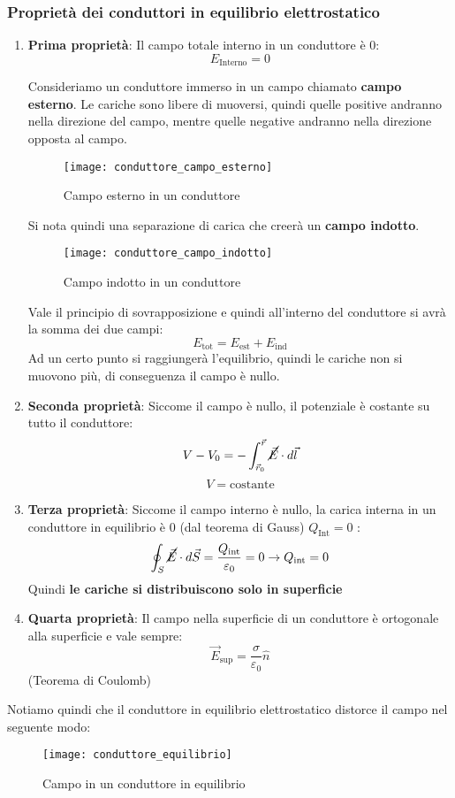 \documentclass[a4paper]{article}
\begin{document}
\subsubsection{Proprietà dei conduttori in equilibrio elettrostatico}
\begin{enumerate}
  \item \textbf{Prima proprietà}: Il campo totale interno in un conduttore è 0:
    \[
      E_{\text{Interno}} = 0
    \] 

    \vspace{1em}
    \noindent
    Consideriamo un conduttore immerso in un campo chiamato \textbf{campo esterno}.
    Le cariche sono libere di muoversi, quindi quelle positive andranno nella direzione
    del campo, mentre quelle negative andranno nella direzione opposta al campo.
    \begin{figure}[H]
      \centering
      \texttt{[image: conduttore\_campo\_esterno]}
      \caption{Campo esterno in un conduttore}
    \end{figure}
    Si nota quindi una separazione di carica che creerà un \textbf{campo indotto}.
    \begin{figure}[H]
      \centering
      \texttt{[image: conduttore\_campo\_indotto]}
      \caption{Campo indotto in un conduttore}
    \end{figure}
    Vale il principio di sovrapposizione e quindi all'interno del conduttore si avrà
    la somma dei due campi:
    \[
      E_{\text{tot}} = E_{\text{est}} + E_{\text{ind}}
    \] 
    Ad un certo punto si raggiungerà l'equilibrio, quindi le cariche non si muovono più,
    di conseguenza il campo è nullo.

  \item \textbf{Seconda proprietà}: Siccome il campo è nullo, il potenziale è costante su
    tutto il conduttore:
    \[
      V - V_0 = - \int_{\vec{r}_0}^{\vec{r}} \cancel{\vec{E}} \cdot d\vec{l}
    \] 
    \[
      V = \text{costante}
    \] 

  \item \textbf{Terza proprietà}: Siccome il campo interno è nullo, la carica interna
    in un conduttore in equilibrio è 0 (dal teorema di Gauss) \( Q_{\text{Int}} = 0 \) :
    \[
      \oint_S \cancel{\vec{E}} \cdot d\vec{S} = \frac{Q_{\text{int}}}{\varepsilon_0} = 0 \to Q_{\text{int}} = 0
    \] 
    Quindi \textbf{le cariche si distribuiscono solo in superficie}

  \item \textbf{Quarta proprietà}: Il campo nella superficie di un conduttore è ortogonale 
    alla superficie e vale sempre:
    \[
      \vec{E}_{\text{sup}} = \frac{\sigma}{\varepsilon_0} \hat{n}
    \] 
    (Teorema di Coulomb)
\end{enumerate}
Notiamo quindi che il conduttore in equilibrio elettrostatico distorce il campo nel
seguente modo:
\begin{figure}[H]
  \centering
  \texttt{[image: conduttore\_equilibrio]}
  \caption{Campo in un conduttore in equilibrio}
\end{figure}
\end{document}

